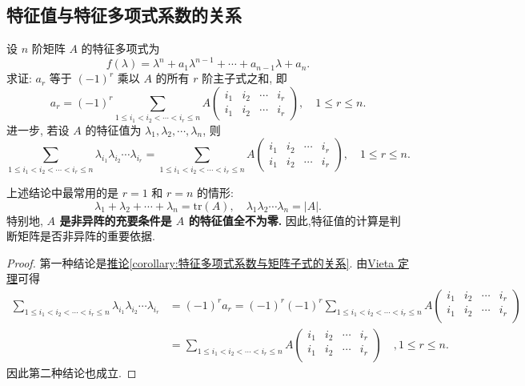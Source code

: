 \documentclass[../../main.tex]{subfiles}
\begin{document}
\subsection{特征值与特征多项式系数的关系}

\begin{proposition}[特征值与特征多项式系数的关系]\label{proposition:特征值与特征多项式系数的关系}
设 $n$ 阶矩阵 $A$ 的特征多项式为
\[
f(\lambda) = \lambda^n + a_1 \lambda^{n-1} + \cdots + a_{n-1} \lambda + a_n.
\]
求证: $a_r$ 等于 $(-1)^r$ 乘以 $A$ 的所有 $r$ 阶主子式之和, 即
\[
a_r = (-1)^r \sum_{1 \leqslant  i_1 < i_2 < \cdots < i_r \leqslant  n}  A
\begin{pmatrix}
i_1 & i_2 & \cdots & i_r \\
i_1 & i_2 & \cdots & i_r
\end{pmatrix}, \quad 1 \leqslant  r \leqslant  n.
\]
进一步, 若设 $A$ 的特征值为 $\lambda_1, \lambda_2, \cdots, \lambda_n$, 则
\[
\sum_{1 \leqslant  i_1 < i_2 < \cdots < i_r \leqslant  n} \lambda_{i_1} \lambda_{i_2} \cdots \lambda_{i_r} = \sum_{1 \leqslant  i_1 < i_2 < \cdots < i_r \leqslant  n} A
\begin{pmatrix}
i_1 & i_2 & \cdots & i_r \\
i_1 & i_2 & \cdots & i_r
\end{pmatrix}, \quad 1 \leqslant  r \leqslant  n.
\]
\end{proposition}
\begin{remark}
上述结论中最常用的是 $r = 1$ 和 $r = n$ 的情形:
\[
\lambda_1 + \lambda_2 + \cdots + \lambda_n = \mathrm{tr}(A), \quad \lambda_1 \lambda_2 \cdots \lambda_n = |A|.
\]
特别地,\textbf{ $A$ 是非异阵的充要条件是 $A$ 的特征值全不为零.} 因此,特征值的计算是判断矩阵是否非异阵的重要依据.
\end{remark}
\begin{proof}
第一种结论是\hyperref[corollary:特征多项式系数与矩阵子式的关系]{推论\ref{corollary:特征多项式系数与矩阵子式的关系}}. 
由\hyperref[theorem:Vieta定理]{Vieta 定理}可得
\begin{align*}
\sum_{1\le i_1<i_2<\cdots <i_r\le n}{\lambda _{i_1}\lambda _{i_2}}\cdots \lambda _{i_r}&=\left( -1 \right) ^ra_r=\left( -1 \right) ^r\left( -1 \right) ^r\sum_{1\le i_1<i_2<\cdots <i_r\le n}{A\left( \begin{matrix}
i_1&		i_2&		\cdots&		i_r\\
i_1&		i_2&		\cdots&		i_r\\
\end{matrix} \right)}
\\
&=\sum_{1\le i_1<i_2<\cdots <i_r\le n}{A\left( \begin{matrix}
i_1&		i_2&		\cdots&		i_r\\
i_1&		i_2&		\cdots&		i_r\\
\end{matrix} \right)}\quad ,1\le r\le n.
\end{align*}
因此第二种结论也成立.
\end{proof}
\end{document}
